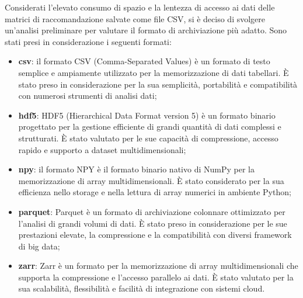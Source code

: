 Considerati l'elevato consumo di spazio e la lentezza di accesso ai dati delle matrici di raccomandazione salvate come file CSV, si è deciso di svolgere un'analisi preliminare per valutare il formato di archiviazione più adatto. Sono stati presi in considerazione i seguenti formati:
\begin{itemize}
    \item \textbf{\gls{csv}}: il formato CSV (Comma-Separated Values) è un formato di testo semplice e ampiamente utilizzato per la memorizzazione di dati tabellari. È stato preso in considerazione per la sua semplicità, portabilità e compatibilità con numerosi strumenti di analisi dati;
    \item \textbf{\gls{hdf5}}: HDF5 (Hierarchical Data Format version 5) è un formato binario progettato per la gestione efficiente di grandi quantità di dati complessi e strutturati. È stato valutato per le sue capacità di compressione, accesso rapido e supporto a dataset multidimensionali;
    \item \textbf{\gls{npy}}: il formato NPY è il formato binario nativo di NumPy per la memorizzazione di array multidimensionali. È stato considerato per la sua efficienza nello storage e nella lettura di array numerici in ambiente Python;
    \item \textbf{\gls{parquet}}: Parquet è un formato di archiviazione colonnare ottimizzato per l'analisi di grandi volumi di dati. È stato preso in considerazione per le sue prestazioni elevate, la compressione e la compatibilità con diversi framework di big data;
    \item \textbf{\gls{zarr}}: Zarr è un formato per la memorizzazione di array multidimensionali che supporta la compressione e l'accesso parallelo ai dati. È stato valutato per la sua scalabilità, flessibilità e facilità di integrazione con sistemi cloud.
\end{itemize}

